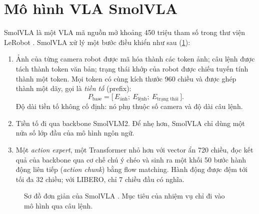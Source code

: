 \documentclass[a4paper,oneside]{report}
\begin{document}
\section{Mô hình VLA SmolVLA}
\label{sec:smolvla}

SmolVLA \citep{shukor2025smolvla} là một VLA mã nguồn mở khoảng 450 triệu tham số trong thư viện LeRobot \citep{cadene2026lerobot}. SmolVLA xử lý một bước điều khiển như sau (\cref{fig:smolvla}):
\begin{enumerate}
  \item Ảnh của từng camera robot được mã hóa thành các token ảnh; câu lệnh được tách thành token văn bản; trạng thái khớp của robot được chiếu tuyến tính thành một token. Mọi token có cùng kích thước 960 chiều và được ghép thành một dãy, gọi là \textit{tiền tố} (prefix):
  \begin{equation}
    P_{\mathrm{base}} = \big[\,E_{\text{ảnh}};\ E_{\text{lệnh}};\ E_{\text{trạng thái}}\,\big].
    \label{eq:prefix_base}
  \end{equation}
  Độ dài tiền tố không cố định: nó phụ thuộc số camera và độ dài câu lệnh.
  \item Tiền tố đi qua backbone SmolVLM2. Để nhẹ hơn, SmolVLA chỉ dùng một nửa số lớp đầu của mô hình ngôn ngữ.
  \item Một \textit{action expert}, một Transformer nhỏ hơn với vector ẩn 720 chiều, đọc kết quả của backbone qua cơ chế chú ý chéo và sinh ra một khối 50 bước hành động liên tiếp (\textit{action chunk}) bằng flow matching. Hành động được đệm tới tối đa 32 chiều; với LIBERO, chỉ 7 chiều đầu có nghĩa.
\end{enumerate}

\begin{figure}[ht]
\centering
{}
\caption{Sơ đồ đơn giản của SmolVLA \citep{shukor2025smolvla}. Mục tiêu của nhiệm vụ chỉ đi vào mô hình qua câu lệnh.}
\label{fig:smolvla}
\end{figure}
\end{document}
